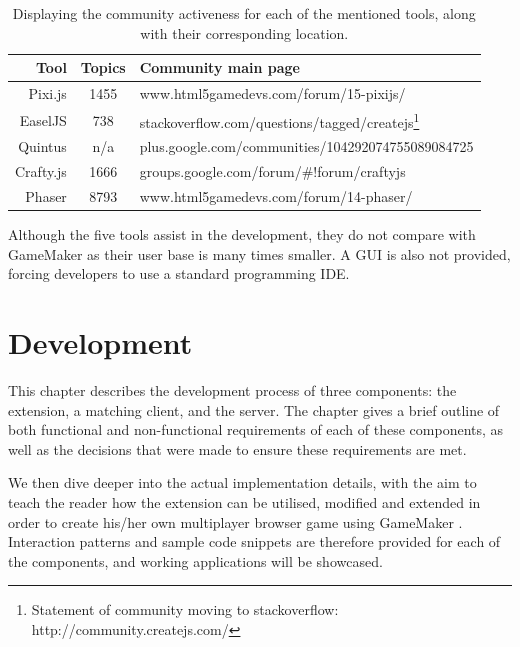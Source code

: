 \documentclass[bsc, 12pt, twoside, singlespacing, parskip, abbrevs, notimes, normalheadings, logo]{styles/infthesis}
\begin{document}
\begin{table}[H]
\centering
  \begin{tabular}{ | r || c | l | }
  \hline
  	\textbf{Tool}			& \textbf{Topics}	& \textbf{Community main page}	\\ \hline\hline
    Pixi.js			& 1455		& www.html5gamedevs.com/forum/15-pixijs/		\\ \hline
    EaselJS			& 738		& stackoverflow.com/questions/tagged/createjs\footnote{Statement of community moving to stackoverflow: http://community.createjs.com/}		\\ \hline
   	Quintus			& n/a		& plus.google.com/communities/104292074755089084725		\\ \hline
    Crafty.js		& 1666		& groups.google.com/forum/\#!forum/craftyjs		\\ \hline
    Phaser			& 8793		& www.html5gamedevs.com/forum/14-phaser/		\\ \hline
  \end{tabular}
  \caption{Displaying the community activeness for each of the mentioned tools, along with their corresponding location.}
\label{table:JS_Framework_Libraries}
\end{table}


Although the five tools assist in the development, they do not compare with GameMaker as their user base is many times smaller. A GUI is also not provided, forcing developers to use a standard programming IDE.


\chapter{Development}
This chapter describes the development process of three components: the extension, a matching client, and the server. The chapter gives a brief outline of both functional and non-functional requirements of each of these components, as well as the decisions that were made to ensure these requirements are met.

We then dive deeper into the actual implementation details, with the aim to teach the reader how the extension can be utilised, modified and extended in order to create his/her own multiplayer browser game using GameMaker \cite{SE_7_Principles}. Interaction patterns and sample code snippets are therefore provided for each of the components, and working applications will be showcased.
\end{document}
